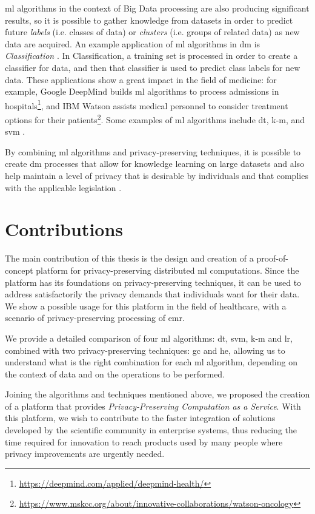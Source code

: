 \ac{ml} algorithms in the context of Big Data processing are also producing significant results, so it is possible to gather knowledge from datasets in order to predict future \emph{labels} (i.e. classes of data) or \emph{clusters} (i.e. groups of related data) as new data are acquired. An example application of \ac{ml} algorithms in \ac{dm} is \textit{Classification} \cite{LeiXu2014}. In Classification, a training set is processed in order to create a classifier for data, and then that classifier is used to predict class labels for new data. These applications show a great impact in the field of medicine: for example, Google DeepMind builds \ac{ml} algorithms to process admissions in hospitals\footnote{\url{https://deepmind.com/applied/deepmind-health/}}, and IBM Watson assists medical personnel to consider treatment options for their patients\footnote{\url{https://www.mskcc.org/about/innovative-collaborations/watson-oncology}}.
Some examples of \ac{ml} algorithms include \ac{dt}, \ac{k-m}, and \ac{svm} \cite{LeiXu2014}.

By combining \ac{ml} algorithms and privacy-preserving techniques, it is possible to create \ac{dm} processes that allow for knowledge learning on large datasets and also help maintain a level of privacy that is desirable by individuals and that complies with the applicable legislation \cite{DAcquisto2015}.




\section{Contributions}
\label{sec:Intro_Contributions}

The main contribution of this thesis is the design and creation of a proof-of-concept platform for privacy-preserving distributed \ac{ml} computations. Since the platform has its foundations on privacy-preserving techniques, it can be used to address satisfactorily the privacy demands that individuals want for their data.
We show a possible usage for this platform in the field of healthcare, with a scenario of privacy-preserving processing of \ac{emr}.

We provide a detailed comparison of four \ac{ml} algorithms: \ac{dt}, \ac{svm}, \ac{k-m} and \ac{lr}, combined with two privacy-preserving techniques: \ac{gc} and \ac{he}, allowing us to understand what is the right combination for each \ac{ml} algorithm, depending on the context of data and on the operations to be performed.

Joining the algorithms and techniques mentioned above, we proposed the creation of a platform that provides \emph{Privacy-Preserving Computation as a Service}. With this platform, we wish to contribute to the faster integration of solutions developed by the scientific community in enterprise systems, thus reducing the time required for innovation to reach products used by many people where privacy improvements are urgently needed.



